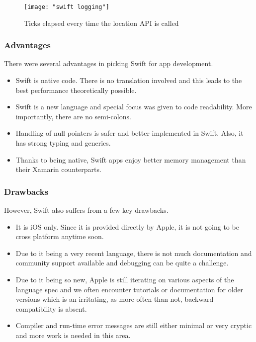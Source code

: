 \documentclass[12pt,a4paper]{article}
\begin{document}
	\begin{figure}
	    \centering
	    \texttt{[image: "swift logging"]}
	    \caption{Ticks elapsed every time the location API is called}
	\end{figure}
	
	\subsubsection{Advantages}
	
	There were several advantages in picking Swift for app development.
	
	\begin{itemize}
	    \item Swift is native code. There is no translation involved and this leads to the best performance theoretically possible.
	    \item Swift is a new language and special focus was given to code readability. More importantly, there are no semi-colons.
	    \item Handling of null pointers is safer and better implemented in Swift. Also, it has strong typing and generics.
	    \item Thanks to being native, Swift apps enjoy better memory management than their Xamarin counterparts.
	\end{itemize}
	
	\subsubsection{Drawbacks}
	
	However, Swift also suffers from a few key drawbacks.
	
	\begin{itemize}
	    \item It is iOS only. Since it is provided directly by Apple, it is not going to be cross platform anytime soon.
	    \item Due to it being a very recent language, there is not much documentation and community support available and debugging can be quite a challenge.
	    \item Due to it being so new, Apple is still iterating on various aspects of the language spec and we often encounter tutorials or documentation for older versions which is an irritating, as more often than not, backward compatibility is absent.
	    \item Compiler and run-time error messages are still either minimal or very cryptic and more work is needed in this area.
	\end{itemize}
	
\end{document}

